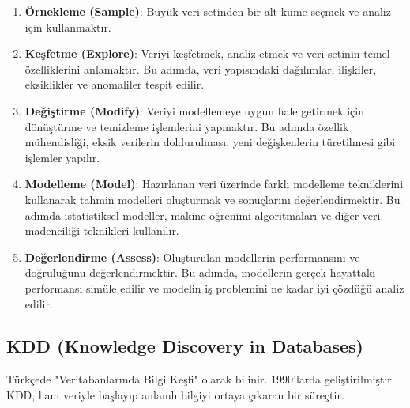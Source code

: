 \begin{enumerate}
    \item \textbf{Örnekleme (Sample)}: Büyük veri setinden bir alt küme seçmek ve analiz için kullanmaktır.
    \item \textbf{Keşfetme (Explore)}: Veriyi keşfetmek, analiz etmek ve veri setinin temel özelliklerini anlamaktır. Bu adımda, veri yapısındaki dağılımlar, ilişkiler, eksiklikler ve anomaliler tespit edilir.
    \item \textbf{Değiştirme (Modify)}: Veriyi modellemeye uygun hale getirmek için dönüştürme ve temizleme işlemlerini yapmaktır. Bu adımda özellik mühendisliği, eksik verilerin doldurulması, yeni değişkenlerin türetilmesi gibi işlemler yapılır.
    \item \textbf{Modelleme (Model)}: Hazırlanan veri üzerinde farklı modelleme tekniklerini kullanarak tahmin modelleri oluşturmak ve sonuçlarını değerlendirmektir. Bu adımda istatistiksel modeller, makine öğrenimi algoritmaları ve diğer veri madenciliği teknikleri kullanılır.
    \item \textbf{Değerlendirme (Assess)}: Oluşturulan modellerin performansını ve doğruluğunu değerlendirmektir. Bu adımda, modellerin gerçek hayattaki performansı simüle edilir ve modelin iş problemini ne kadar iyi çözdüğü analiz edilir.
\end{enumerate}

\newpage

\subsection{KDD (Knowledge Discovery in Databases)}

Türkçede "Veritabanlarında Bilgi Keşfi" olarak bilinir. 1990'larda geliştirilmiştir. KDD, ham veriyle başlayıp anlamlı bilgiyi ortaya çıkaran bir süreçtir.

